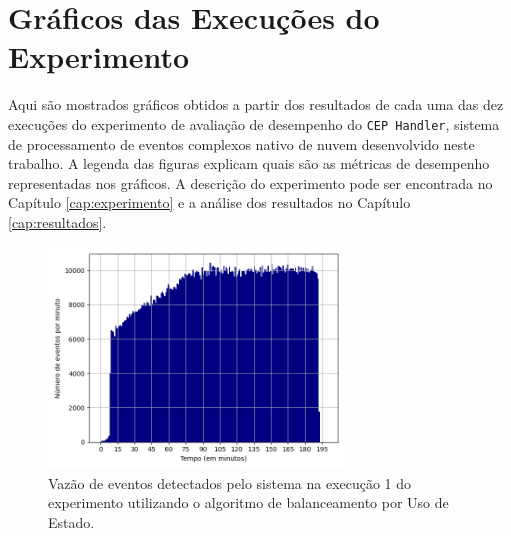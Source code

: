 \chapter{Gráficos das Execuções do Experimento}
\label{ape:graphics}

Aqui são mostrados gráficos obtidos a partir dos resultados de cada uma das dez execuções do experimento de avaliação de desempenho do \texttt{CEP Handler}, sistema de processamento de eventos complexos nativo de nuvem  desenvolvido neste trabalho. A legenda das figuras explicam quais são as métricas de desempenho representadas nos gráficos. A descrição do experimento pode ser encontrada no Capítulo \ref{cap:experimento} e a análise dos resultados no Capítulo \ref{cap:resultados}. 




\begin{figure}[h]
\centering
\includegraphics[width=0.7\textwidth]{figuras/graphics/histogram_vazao_5-dez-su.png}
\caption{Vazão de eventos detectados pelo sistema na execução 1 do experimento utilizando o algoritmo de balanceamento por Uso de Estado.}
\label{fig:vazao_5-dez-su}
\end{figure}



